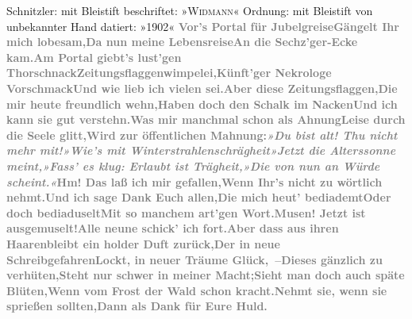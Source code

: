 {\begin{ledgroupsized}[t]{13cm}
{\newline{}Schnitzler: mit Bleistift beschriftet: »\textsc{Widmann}« \newline{}Ordnung: mit Bleistift von unbekannter Hand datiert: »1902« }\toendnotes[C]{\smallbreak}\stanza{}{\pb}\textcolor{gray}{\textbf{Vor’s Portal für Jubelgreise}}\newverse{}\textcolor{gray}{\textbf{Gängelt Ihr mich lobesam,}}\newverse{}\textcolor{gray}{\textbf{Da nun meine Lebensreise}}\newverse{}\textcolor{gray}{\textbf{An die Sechz’ger-Ecke kam.}}\stanzaend{}\stanza{}\textcolor{gray}{\textbf{Am Portal giebt’s lust’gen Thorschnack}}\newverse{}\textcolor{gray}{\textbf{Zeitungsflaggenwimpelei,}}\newverse{}\textcolor{gray}{\textbf{Künft’ger Nekrologe Vorschmack}}\newverse{}\textcolor{gray}{\textbf{Und wie lieb ich vielen sei.}}\stanzaend{}\stanza{}\textcolor{gray}{\textbf{Aber diese Zeitungsflaggen,}}\newverse{}\textcolor{gray}{\textbf{Die mir heute freundlich wehn,}}\newverse{}\textcolor{gray}{\textbf{Haben doch den Schalk im Nacken}}\newverse{}\textcolor{gray}{\textbf{Und ich kann sie gut verstehn.}}\stanzaend{}\stanza{}\textcolor{gray}{\textbf{Was mir manchmal schon als Ahnung}}\newverse{}\textcolor{gray}{\textbf{Leise durch die Seele glitt,}}\newverse{}\textcolor{gray}{\textbf{Wird zur öffentlichen Mahnung:}}\newverse{}\textcolor{gray}{\textbf{\emph{»Du bist alt! Thu nicht mehr mit!}}}\stanzaend{}\stanza{}\textcolor{gray}{\textbf{\emph{»Wie’s mit Winterstrahlenschrägheit}}}\newverse{}\textcolor{gray}{\textbf{\emph{»Jetzt die Alterssonne meint,}}}\newverse{}\textcolor{gray}{\textbf{\emph{»Fass’ es klug: Erlaubt ist Trägheit,}}}\newverse{}\textcolor{gray}{\textbf{\emph{»Die von nun an Würde scheint.«}}}\stanzaend{}\stanza{}{\pb}\textcolor{gray}{\textbf{Hm! Das laß ich mir gefallen,}}\newverse{}\textcolor{gray}{\textbf{Wenn Ihr’s nicht zu wörtlich nehmt.}}\newverse{}\textcolor{gray}{\textbf{Und ich sage Dank Euch allen,}}\newverse{}\textcolor{gray}{\textbf{Die mich heut’ bediademt}}\stanzaend{}\stanza{}\textcolor{gray}{\textbf{Oder doch bediaduselt}}\newverse{}\textcolor{gray}{\textbf{Mit so manchem art’gen Wort.}}\newverse{}\textcolor{gray}{\textbf{Musen! Jetzt ist ausgemuselt!}}\newverse{}\textcolor{gray}{\textbf{Alle neune schick’ ich fort.}}\stanzaend{}\stanza{}\textcolor{gray}{\textbf{Aber dass aus ihren Haaren}}\newverse{}\textcolor{gray}{\textbf{bleibt ein holder Duft zurück,}}\newverse{}\textcolor{gray}{\textbf{Der in neue Schreibgefahren}}\newverse{}\textcolor{gray}{\textbf{Lockt, in neuer Träume Glück, –}}\stanzaend{}\stanza{}\textcolor{gray}{\textbf{Dieses gänzlich zu verhüten,}}\newverse{}\textcolor{gray}{\textbf{Steht nur schwer in meiner Macht;}}\newverse{}\textcolor{gray}{\textbf{Sieht man doch auch späte Blüten,}}\newverse{}\textcolor{gray}{\textbf{Wenn vom Frost der Wald schon kracht.}}\stanzaend{}\stanza{}\textcolor{gray}{\textbf{Nehmt sie, wenn sie sprießen sollten,}}\newverse{}\textcolor{gray}{\textbf{Dann als Dank für Eure Huld.}}\newverse{}\textcolor{gray}{\textbf{}}\newverse{}\textcolor{gray}{\textbf{}}\stanzaend{}\pstart

\end{ledgroupsized}}
